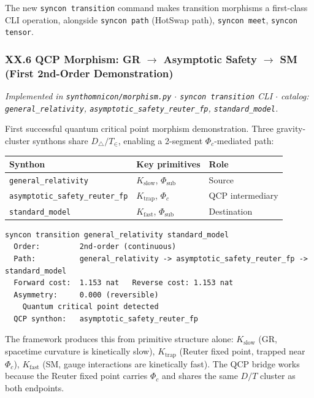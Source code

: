 \documentclass[12pt,a4paper]{article}
\begin{document}
The new \texttt{syncon transition} command makes transition morphisms a first-class CLI operation, alongside \texttt{syncon path} (HotSwap path), \texttt{syncon meet}, \texttt{syncon tensor}.

\subsubsection{XX.6 QCP Morphism: GR $\rightarrow$ Asymptotic Safety $\rightarrow$ SM (First 2nd-Order Demonstration)}

\emph{Implemented in \texttt{synthomnicon/morphism.py} $\cdot$ \texttt{syncon transition} CLI $\cdot$ catalog: \texttt{general\_relativity}, \texttt{asymptotic\_safety\_reuter\_fp}, \texttt{standard\_model}.}

First successful quantum critical point morphism demonstration. Three gravity-cluster synthons share $D_{\bigtriangleup} / T_{\in}$, enabling a 2-segment $\Phi_c$-mediated path:

\begin{table}[htbp]
\centering
\small
{}
\begin{tabularx}{\textwidth}{>{\centering\arraybackslash}X >{\centering\arraybackslash}X >{\centering\arraybackslash}X}
\toprule
\rowcolor{gray!25}\textbf{Synthon} & \textbf{Key primitives} & \textbf{Role} \\
\midrule
\rowcolors{1}{white}{gray!10}
\texttt{general\_relativity} & $K_{\text{slow}}$, $\Phi_{\text{sub}}$ & Source \\
\texttt{asymptotic\_safety\_reuter\_fp} & $K_{\text{trap}}$, \textbf{$\Phi_c$} & QCP intermediary \\
\texttt{standard\_model} & $K_{\text{fast}}$, $\Phi_{\text{sub}}$ & Destination \\
\bottomrule
\end{tabularx}
\end{table}

\begin{lstlisting}
syncon transition general_relativity standard_model
  Order:         2nd-order (continuous)
  Path:          general_relativity -> asymptotic_safety_reuter_fp -> standard_model
  Forward cost:  1.153 nat   Reverse cost: 1.153 nat
  Asymmetry:     0.000 (reversible)
    Quantum critical point detected
  QCP synthon:   asymptotic_safety_reuter_fp
\end{lstlisting}

The framework produces this from primitive structure alone: $K_{\text{slow}}$ (GR, spacetime curvature is kinetically slow), $K_{\text{trap}}$ (Reuter fixed point, trapped near $\Phi_c$), $K_{\text{fast}}$ (SM, gauge interactions are kinetically fast). The QCP bridge works because the Reuter fixed point carries $\Phi_c$ and shares the same $D/T$ cluster as both endpoints.
\end{document}
